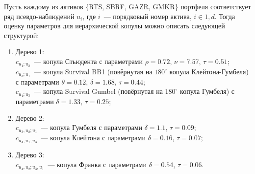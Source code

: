 Пусть каждому из активов \{RTS, SBRF, GAZR, GMKR\} портфеля соответствует ряд псевдо-наблюдений $u_i$, где $i$~--- порядковый номер актива, $i \in \overline{1,d}$. 
Тогда оценку параметров для иерархической копулы можно описать следующей структурой:
%
\begin{enumerate}[label=(\roman*),leftmargin=1cm,labelwidth=1cm]
    \item Дерево 1:\\
    $c_{u_1;u_2}$~--- копула Стьюдента с параметрами $\rho=0.72$, $\nu=7.57$, $\tau=0.51$;\\
    $c_{u_3;u_1}$~--- копула Survival BB1 (повёрнутая на $180^{\circ}$ копула Клейтона-Гумбеля) с параметрами $\theta=0.12$, $\delta=1.68$, $\tau=0.44$;\\
    $c_{u_4;u_3}$~--- копула Survival Gumbel (повёрнутая на $180^{\circ}$ копула Гумбеля) с параметрами $\delta=1.33$, $\tau=0.25$;
    \item Дерево 2:\\
    $c_{u_3,u_2;u_1}$~--- копула Гумбеля с параметрами $\delta=1.1$, $\tau=0.09$;\\
    $c_{u_4,u_1;u_3}$~--- копула Клейтона с параметрами $\delta=0.16$, $\tau=0.07$;
    \item Дерево 3:\\
    $c_{u_4,u_2;u_3,u_1}$~--- копула Франка с параметрами $\delta=0.54$, $\tau=0.06$.
\end{enumerate}

